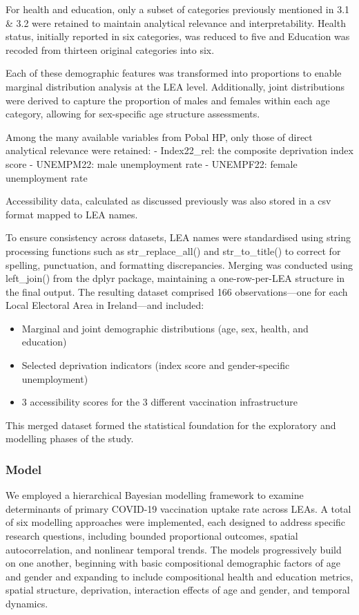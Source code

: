 \documentclass{article}
\providecommand{\tightlist}{%
  \setlength{\itemsep}{0pt}\setlength{\parskip}{0pt}}
\begin{document}
For health and education, only a subset of categories previously
mentioned in 3.1 \& 3.2 were retained to maintain analytical relevance
and interpretability. Health status, initially reported in six
categories, was reduced to five and Education was recoded from thirteen
original categories into six.

Each of these demographic features was transformed into proportions to
enable marginal distribution analysis at the LEA level. Additionally,
joint distributions were derived to capture the proportion of males and
females within each age category, allowing for sex-specific age
structure assessments.

Among the many available variables from Pobal HP, only those of direct
analytical relevance were retained: - Index22\_rel: the composite
deprivation index score - UNEMPM22: male unemployment rate - UNEMPF22:
female unemployment rate

Accessibility data, calculated as discussed previously was also stored
in a csv format mapped to LEA names.

To ensure consistency across datasets, LEA names were standardised using
string processing functions such as str\_replace\_all() and
str\_to\_title() to correct for spelling, punctuation, and formatting
discrepancies. Merging was conducted using left\_join() from the dplyr
package, maintaining a one-row-per-LEA structure in the final output.
The resulting dataset comprised 166 observations---one for each Local
Electoral Area in Ireland---and included:

\begin{itemize}
\tightlist
\item
  Marginal and joint demographic distributions (age, sex, health, and
  education)
\item
  Selected deprivation indicators (index score and gender-specific
  unemployment)
\item
  3 accessibility scores for the 3 different vaccination infrastructure
\end{itemize}

This merged dataset formed the statistical foundation for the
exploratory and modelling phases of the study.

\subsubsection{Model}\label{model}

We employed a hierarchical Bayesian modelling framework to examine
determinants of primary COVID-19 vaccination uptake rate across LEAs. A
total of six modelling approaches were implemented, each designed to
address specific research questions, including bounded proportional
outcomes, spatial autocorrelation, and nonlinear temporal trends. The
models progressively build on one another, beginning with basic
compositional demographic factors of age and gender and expanding to
include compositional health and education metrics, spatial structure,
deprivation, interaction effects of age and gender, and temporal
dynamics.
\end{document}
